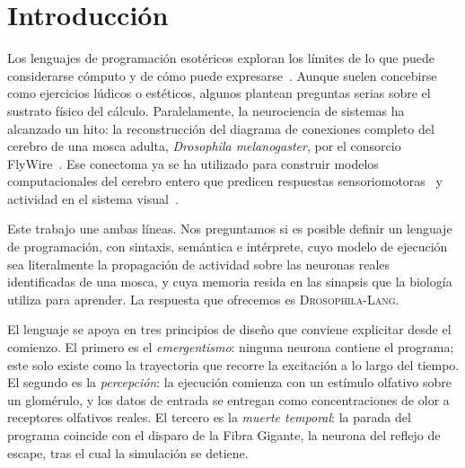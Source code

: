 \documentclass[11pt,a4paper]{article}
\theoremstyle{plain}
\theoremstyle{definition}
\theoremstyle{remark}
\newcommand{\dros}{\textup{\textsc{Drosophila-Lang}}}
\newcommand{\Dm}{\textit{Drosophila melanogaster}}
\begin{document}
\begin{otherlanguage}{english}
\begin{abstract}
We present \dros{}, an esoteric programming language whose execution model
is the brain of a fruit fly rather than a von Neumann machine. Programs run
on the complete adult FlyWire v783 connectome (138{,}639 neurons, 2{,}700{,}513
connections with at least five synapses), with synaptic signs derived from
predicted neurotransmitters. Each instruction is mapped, by an
anatomy-guided recruitment procedure, onto an identified real neuron.
Program memory lives in Kenyon cell--to--mushroom body output neuron
synapses rewritten by a dopaminergic neuromodulatory rule. We prove Turing
completeness by reduction to Minsky register machines, bound the error of
the stochastic dynamics, and release a reproducible Python interpreter.
\end{abstract}
\end{otherlanguage}

\section{Introducción}
\label{sec:intro}

Los lenguajes de programación esotéricos exploran los límites de lo que puede
considerarse cómputo y de cómo puede expresarse~\cite{mateas2005}. Aunque suelen
concebirse como ejercicios lúdicos o estéticos, algunos plantean preguntas
serias sobre el sustrato físico del cálculo. Paralelamente, la neurociencia de
sistemas ha alcanzado un hito: la reconstrucción del diagrama de conexiones
completo del cerebro de una mosca adulta, \Dm{}, por el consorcio
FlyWire~\cite{dorkenwald2024,schlegel2024}. Ese conectoma ya se ha utilizado
para construir modelos computacionales del cerebro entero que predicen
respuestas sensoriomotoras~\cite{shiu2024} y actividad en el sistema
visual~\cite{lappalainen2024}.

Este trabajo une ambas líneas. Nos preguntamos si es posible definir un
lenguaje de programación, con sintaxis, semántica e intérprete, cuyo modelo de
ejecución sea literalmente la propagación de actividad sobre las neuronas
reales identificadas de una mosca, y cuya memoria resida en las sinapsis que
la biología utiliza para aprender. La respuesta que ofrecemos es
\dros{}.

El lenguaje se apoya en tres principios de diseño que conviene explicitar
desde el comienzo. El primero es el \emph{emergentismo}: ninguna neurona
contiene el programa; este solo existe como la trayectoria que recorre la
excitación a lo largo del tiempo. El segundo es la \emph{percepción}: la
ejecución comienza con un estímulo olfativo sobre un glomérulo, y los datos
de entrada se entregan como concentraciones de olor a receptores olfativos
reales. El tercero es la \emph{muerte temporal}: la parada del programa
coincide con el disparo de la Fibra Gigante, la neurona del reflejo de
escape, tras el cual la simulación se detiene.
\end{document}
